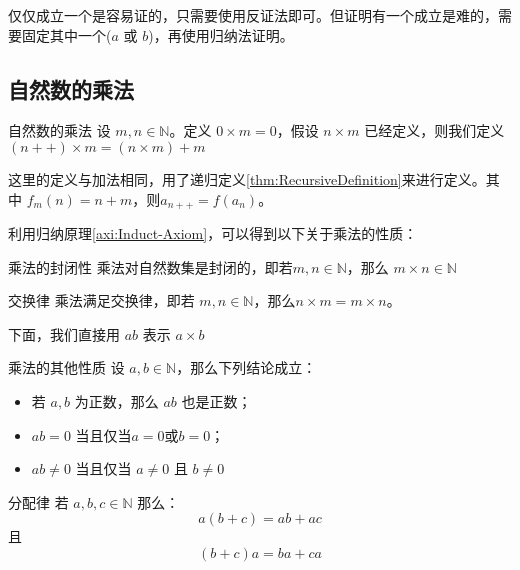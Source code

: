 \begin{note}
	仅仅成立一个是容易证的，只需要使用反证法即可。但证明有一个成立是难的，需要固定其中一个($a$ 或 $b$)，再使用归纳法证明。
\end{note}

\subsection{自然数的乘法}

\begin{definition}{自然数的乘法}{}
	设 $m,n \in \mathbb N$。定义 $0 \times m = 0$，假设 $n\times m$ 已经定义，则我们定义 $(n++)\times m = (n\times m) + m$
\end{definition}

\begin{note}
	这里的定义与加法相同，用了递归定义\ref{thm:RecursiveDefinition}来进行定义。其中 $f_m(n) = n+m$，则$a_{n++} = f(a_n)$。
\end{note}

利用归纳原理\ref{axi:Induct-Axiom}，可以得到以下关于乘法的性质：

\begin{property}{乘法的封闭性}{}
	乘法对自然数集是封闭的，即若$m,n\in \mathbb N$，那么 $m\times n\in \mathbb N$
\end{property}

\begin{property}{交换律}{}
	乘法满足交换律，即若 $m,n\in \mathbb N$，那么$n\times m = m\times n$。
\end{property}

\begin{note}
	下面，我们直接用 $ab$ 表示 $a\times b$
\end{note}

\begin{property}{乘法的其他性质}{}
	设 $a,b\in \mathbb N$，那么下列结论成立：
	\begin{itemize}
		\item 若 $a,b$ 为正数，那么 $ab$ 也是正数；
		\item $ab=0$ 当且仅当$a=0$或$b=0$；
		\item $ab\ne 0$ 当且仅当 $a\ne 0$ 且 $b\ne 0$
	\end{itemize}
\end{property}

\begin{property}{分配律}{}
	若 $a,b,c\in \mathbb N$ 那么：
	$$
	a(b+c) = ab+ac
	$$
	\noindent 且
	$$
	(b+c)a = ba+ca
	$$
\end{property}

